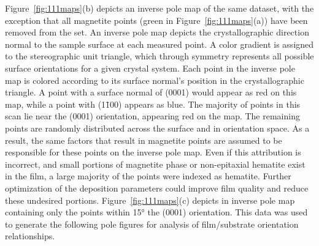 \documentclass[12pt,%
              twoside,
               letterpaper]{uiothesis}
\begin{document}
Figure~\ref{fig:111maps}(b) depicts an inverse pole map of the same dataset, with the exception
that all magnetite points (green in Figure~\ref{fig:111maps}(a)) have been removed from the
set. An inverse pole map depicts the crystallographic direction normal to the sample
surface at each measured point. A color gradient is assigned to the stereographic unit
triangle, which through symmetry represents all possible surface orientations for a given
crystal system. Each point in the inverse pole map is colored according to its surface
normal's position in the crystallographic triangle. A point with a surface normal of
(0001) would appear as red on this map, while a point with (1\={1}00) appears as blue. The
majority of points in this scan lie near the (0001) orientation, appearing red on the map.
The remaining points are randomly distributed across the surface and in orientation space.
As a result, the same factors that result in magnetite points are assumed to be
responsible for these points on the inverse pole map. Even if this attribution is
incorrect, and small portions of magnetite phase or non-epitaxial hematite exist in the
film, a large majority of the points were indexed as hematite. Further optimization of the
deposition parameters could improve film quality and reduce these undesired portions.
Figure~\ref{fig:111maps}(c) depicts in inverse pole map containing only the points within
15\si{\degree} the (0001) orientation. This data was used to generate the following pole
figures for analysis of film/substrate orientation relationships.
\end{document}
